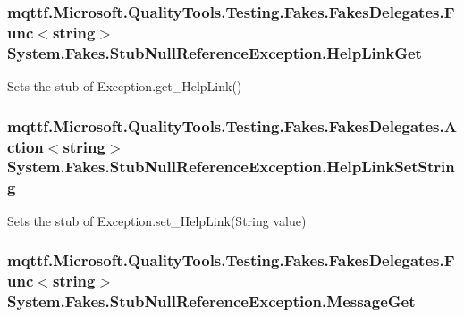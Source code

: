 \hypertarget{class_system_1_1_fakes_1_1_stub_null_reference_exception_a61b2a25db8aa211314d71ad8c662efa9}{
\subsubsection[{Help\-Link\-Get}]{\setlength{\rightskip}{0pt plus 5cm}mqttf.\-Microsoft.\-Quality\-Tools.\-Testing.\-Fakes.\-Fakes\-Delegates.\-Func$<$string$>$ System.\-Fakes.\-Stub\-Null\-Reference\-Exception.\-Help\-Link\-Get}}\label{class_system_1_1_fakes_1_1_stub_null_reference_exception_a61b2a25db8aa211314d71ad8c662efa9}


Sets the stub of Exception.\-get\-\_\-\-Help\-Link()

\hypertarget{class_system_1_1_fakes_1_1_stub_null_reference_exception_ac4343f092a47ba02067075af380ce769}{
\subsubsection[{Help\-Link\-Set\-String}]{\setlength{\rightskip}{0pt plus 5cm}mqttf.\-Microsoft.\-Quality\-Tools.\-Testing.\-Fakes.\-Fakes\-Delegates.\-Action$<$string$>$ System.\-Fakes.\-Stub\-Null\-Reference\-Exception.\-Help\-Link\-Set\-String}}\label{class_system_1_1_fakes_1_1_stub_null_reference_exception_ac4343f092a47ba02067075af380ce769}


Sets the stub of Exception.\-set\-\_\-\-Help\-Link(\-String value)

\hypertarget{class_system_1_1_fakes_1_1_stub_null_reference_exception_aa3e968148c18c5eacb34cd0f99afeadd}{
\subsubsection[{Message\-Get}]{\setlength{\rightskip}{0pt plus 5cm}mqttf.\-Microsoft.\-Quality\-Tools.\-Testing.\-Fakes.\-Fakes\-Delegates.\-Func$<$string$>$ System.\-Fakes.\-Stub\-Null\-Reference\-Exception.\-Message\-Get}}\label{class_system_1_1_fakes_1_1_stub_null_reference_exception_aa3e968148c18c5eacb34cd0f99afeadd}


